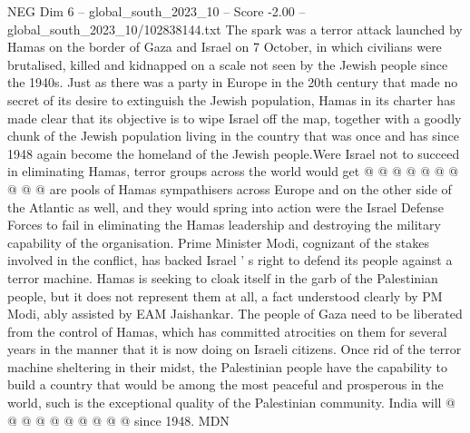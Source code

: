 \begin{textsample}{NEG Dim 6 – global\_south\_2023\_10 – Score -2.00 – global\_south\_2023\_10/102838144.txt}
The spark was a terror attack launched by Hamas on the border of Gaza and Israel on 7 October, in which civilians were brutalised, killed and kidnapped on a scale not seen by the Jewish people since the 1940s.
Just as there was a party in Europe in the 20th century that made no secret of its desire to extinguish the Jewish population, Hamas in its charter has made clear that its objective is to wipe Israel off the map, together with a goodly chunk of the Jewish population living in the country that was once and has since 1948 again become the homeland of the Jewish people.Were Israel not to succeed in eliminating Hamas, terror groups across the world would get @ @ @ @ @ @ @ @ @ @ are pools of Hamas sympathisers across Europe and on the other side of the Atlantic as well, and they would spring into action were the Israel Defense Forces to fail in eliminating the Hamas leadership and destroying the military capability of the organisation.
Prime Minister Modi, cognizant of the stakes involved in the conflict, has backed Israel ' s right to defend its people against a terror machine.
Hamas is seeking to cloak itself in the garb of the Palestinian people, but it does not represent them at all, a fact understood clearly by PM Modi, ably assisted by EAM Jaishankar.
The people of Gaza need to be liberated from the control of Hamas, which has committed atrocities on them for several years in the manner that it is now doing on Israeli citizens.
Once rid of the terror machine sheltering in their midst, the Palestinian people have the capability to build a country that would be among the most peaceful and prosperous in the world, such is the exceptional quality of the Palestinian community.
India will @ @ @ @ @ @ @ @ @ @ since 1948.
MDN

\end{textsample}
